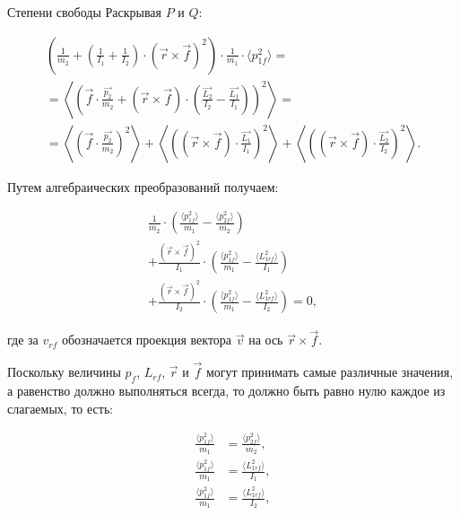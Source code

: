 \documentclass{article}
\begin{document}
\begin{section}{Степени свободы}
		Раскрывая $P$ и $Q$:

		\begin{multline*}
			\left( \frac{1}{m_2} + \left( \frac{1}{I_1} + \frac{1}{I_2} \right) \cdot \left( \vec{r} \times \vec{f} \right)^2 \right) \cdot \frac{1}{m_1} \cdot \langle p_{1f}^2 \rangle = \\
			= \left\langle \left( \vec{f} \cdot \frac{\vec{p_2}}{m_2} + \left( \vec{r} \times \vec{f} \right) \cdot \left( \frac{\vec{L_2}}{I_2} - \frac{\vec{L_1}}{I_1} \right) \right)^2 \right\rangle = \\
			= \left\langle \left( \vec{f} \cdot \frac{\vec{p_2}}{m_2} \right)^2 \right\rangle + \left\langle \left( \left( \vec{r} \times \vec{f} \right) \cdot \frac{\vec{L_1}}{I_1} \right)^2 \right\rangle + \left\langle \left( \left( \vec{r} \times \vec{f} \right) \cdot \frac{\vec{L_2}}{I_2} \right)^2 \right\rangle.
		\end{multline*}

		Путем алгебраических преобразований получаем:

		\begin{multline*}
			\frac{1}{m_2} \cdot \left( \frac{\langle p_{1f}^2 \rangle}{m_1} - \frac{\langle p_{2f}^2 \rangle}{m_2} \right) \\
			+ \frac{\left( \vec{r} \times \vec{f} \right)^2}{I_1} \cdot \left( \frac{\langle p_{1f}^2 \rangle}{m_1} - \frac{\langle L_{1rf}^2 \rangle}{I_1} \right) \\
			+ \frac{\left( \vec{r} \times \vec{f} \right)^2}{I_2} \cdot \left( \frac{\langle p_{1f}^2 \rangle}{m_1} - \frac{\langle L_{1rf}^2 \rangle}{I_2} \right) = 0,
		\end{multline*}

		где за $v_{rf}$ обозначается проекция вектора $\vec{v}$ на ось $\vec{r} \times \vec{f}$.

		Поскольку величины $p_f$, $L_{rf}$, $\vec{r}$ и $\vec{f}$ могут принимать самые различные значения, а равенство должно выполняться всегда, то должно быть равно нулю каждое из слагаемых, то есть:

		\begin{align*}
			\frac{\langle p_{1f}^2 \rangle}{m_1} &= \frac{\langle p_{2f}^2 \rangle}{m_2}, \\
			\frac{\langle p_{1f}^2 \rangle}{m_1} &= \frac{\langle L_{1rf}^2 \rangle}{I_1}, \\
			\frac{\langle p_{1f}^2 \rangle}{m_1} &= \frac{\langle L_{1rf}^2 \rangle}{I_2},
		\end{align*}


\end{section}
\end{document}
